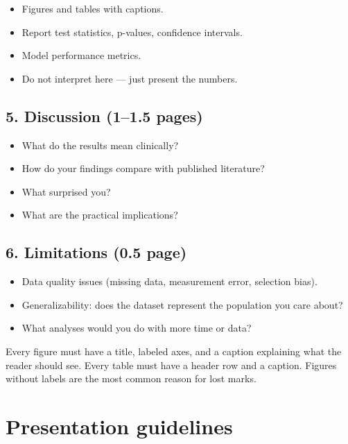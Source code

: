 \begin{itemize}
  \item Figures and tables with captions.
  \item Report test statistics, p-values, confidence intervals.
  \item Model performance metrics.
  \item Do not interpret here --- just present the numbers.
\end{itemize}

\subsection{5. Discussion (1--1.5 pages)}

\begin{itemize}
  \item What do the results mean clinically?
  \item How do your findings compare with published literature?
  \item What surprised you?
  \item What are the practical implications?
\end{itemize}

\subsection{6. Limitations (0.5 page)}

\begin{itemize}
  \item Data quality issues (missing data, measurement error, selection bias).
  \item Generalizability: does the dataset represent the population you care about?
  \item What analyses would you do with more time or data?
\end{itemize}

\begin{warningbox}
Every figure must have a title, labeled axes, and a caption explaining what the reader should see. Every table must have a header row and a caption. Figures without labels are the most common reason for lost marks.
\end{warningbox}

\section{Presentation guidelines}

